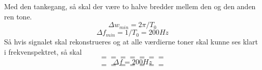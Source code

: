 \begin{rubrik}[Eksamenssæt 2021]
\begin{eksamensOpgave}
\begin{UnderOpgave}
            Med den tankegang, så skal der være to halve bredder mellem den og den anden ren tone. 
            \[\Delta w_{min} = 2\pi/T_0\]
            \[\Delta f_{min} = 1/T_0 = 200Hz\]
            Så hvis signalet skal rekonstrueres og at alle værdierne toner skal kunne ses klart i frekvenspektret, så skal 
            \[=======\]
            \[\Delta f = 200Hz \]
            \[=======\]
        \end{UnderOpgave}
    \end{eksamensOpgave}
\end{rubrik}\setcounter{eksamensOpgave}{0}

\begin{rubrik}
    \begin{eksamensOpgave}
        
    \end{eksamensOpgave}
    \begin{eksamensOpgave}
        
    \end{eksamensOpgave}
    \begin{eksamensOpgave}
        

\end{eksamensOpgave}
\end{rubrik}
